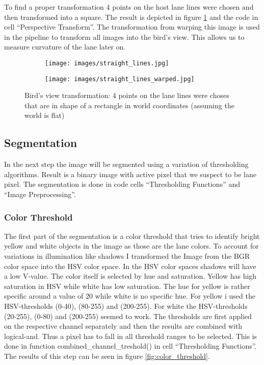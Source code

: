\documentclass[a4paper, 11pt, DIV=14]{scrartcl}
\begin{document}
To find a proper transformation 4 points on the host lane lines were chosen and then transformed into a square. The result is depicted in figure \ref{fig:birds_view} and the code in cell ``Perspective Transform''. The transformation from warping this image is used in the pipeline to transform all images into the bird's view. This allows us to measure curvature of the lane later on.

\begin{figure}[h]
    \centering
    \begin{subfigure}{0.45\textwidth}
        \texttt{[image: images/straight\_lines.jpg]}
    \end{subfigure}\quad
    \begin{subfigure}{0.45\textwidth}
        \texttt{[image: images/straight\_lines\_warped.jpg]}
    \end{subfigure} 
    \caption{Bird's view transformation: 4 points on the lane lines were choses that are in shape of a rectangle in world coordinates (assuming the world is flat)}
    \label{fig:birds_view}
\end{figure}

\subsection{Segmentation}

In the next step the image will be segmented using a variation of thresholding algorithms. Result is a binary image with active pixel that we suspect to be lane pixel. The segmentation is done in code cells ``Thresholding Functions'' and ``Image Preprocessing''.

\subsubsection*{Color Threshold}
The first part of the segmentation is a color threshold that tries to identify bright yellow and white objects in the image as those are the lane colors. To account for variations in illumination like shadows I transformed the Image from the BGR color space into the HSV color space. In the HSV color spaces shadows will have a low V-value. The color itself is selected by hue and saturation. Yellow has high saturation in HSV while white has low saturation. The hue for yellow is rather specific around a value of 20 while white is no specific hue. For yellow i used the HSV-thresholds (0-40), (80-255) and (200-255). For white the HSV-thresholds (20-255), (0-80) and (200-255) seemed to work. The thresholds are first applied on the respective channel separately and then the results are combined with logical-and. Thus a pixel has to fall in all threshold ranges to be selected. This is done in function combined\_channel\_treshold() in cell ``Thresholding Functions''. The results of this step can be seen in figure \ref{fig:color_threshold}.
\end{document}
